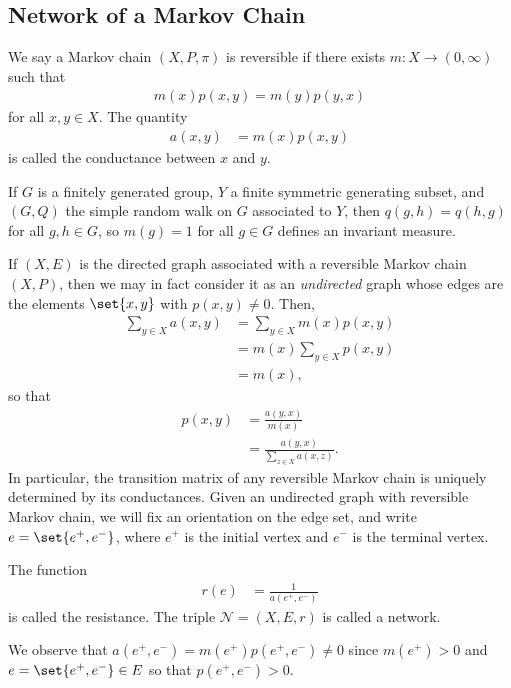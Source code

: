 \documentclass[10pt]{mypackage}
\begin{document}
\subsection{Network of a Markov Chain}%
\begin{definition}
  We say a Markov chain $\left( X,P,\pi \right)$ is reversible if there exists $m\colon X\to (0,\infty)$ such that
  \begin{align*}
    m\left( x \right)p\left( x,y \right) = m\left( y \right)p\left( y,x \right)
  \end{align*}
  for all $x,y\in X$. The quantity
  \begin{align*}
    a\left( x,y \right) &= m\left( x \right)p\left( x,y \right)
  \end{align*}
  is called the conductance between $x$ and $y$.
\end{definition}
\begin{example}
  If $G$ is a finitely generated group, $Y$ a finite symmetric generating subset, and $\left( G,Q \right)$ the simple random walk on $G$ associated to $Y$, then $q\left( g,h \right) = q\left( h,g \right)$ for all $g,h\in G$, so $m(g) = 1$ for all $g\in G$ defines an invariant measure.
\end{example}
If $\left( X,E \right)$ is the directed graph associated with a reversible Markov chain $\left( X,P \right)$, then we may in fact consider it as an \textit{undirected} graph whose edges are the elements $\set{x,y}$ with $p\left( x,y \right)\neq 0$. Then,
\begin{align*}
  \sum_{y\in X}a\left( x,y \right) &= \sum_{y\in X}m(x)p\left( x,y \right)\\
                                   &= m(x)\sum_{y\in X}p\left( x,y \right)\\
                                   &= m(x),
\end{align*}
so that
\begin{align*}
  p\left( x,y \right) &= \frac{a\left( y,x \right)}{m(x)}\\
                      &= \frac{a\left( y,x \right)}{\sum_{z\in X}a\left( x,z \right)}.
\end{align*}
In particular, the transition matrix of any reversible Markov chain is uniquely determined by its conductances. Given an undirected graph with reversible Markov chain, we will fix an orientation on the edge set, and write $e = \set{e^+,e^-}$, where $e^+$ is the initial vertex and $e^-$ is the terminal vertex.
\begin{definition}
  The function
  \begin{align*}
    r(e) &= \frac{1}{a\left( e^+,e^- \right)}
  \end{align*}
  is called the resistance. The triple $\mathcal{N} = \left( X,E,r \right)$ is called a network.
\end{definition}
We observe that $a\left( e^+,e^- \right) = m\left( e^+ \right)p\left( e^+,e^- \right)\neq 0$ since $m\left( e^+ \right) > 0$ and $e = \set{e^+,e^{-}}\in E$ so that $p\left( e^+,e^- \right) > 0$.
\end{document}
